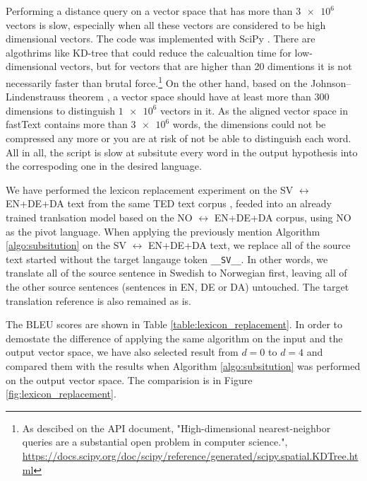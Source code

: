 \documentclass[thesis,fonts=libertine]{cluu}
\begin{document}
Performing a distance query on a vector space that has more than $\num{3e6}$ vectors is slow, especially when all these vectors are considered to be high dimensional vectors. The code was implemented with SciPy \parencite{Virtanen:2019aa}. There are algothrims like KD-tree \parencite{Maneewongvatana:aa} that could reduce the calcualtion time for low-dimensional vectors, but for vectors that are higher than 20 dimentions it is not necessarily faster than brutal force.\footnote{As descibed on the API document, "High-dimensional nearest-neighbor queries are a substantial open problem in computer science.", \url{https://docs.scipy.org/doc/scipy/reference/generated/scipy.spatial.KDTree.html}} On the other hand, based on the Johnson–Lindenstrauss theorem \parencite{johnson1984extensions}, a vector space should have at least more than 300 dimensions to distinguish $\num{1e6}$ vectors in it. As the aligned vector space in fastText contains more than $\num{3e6}$ words, the dimensions could not be compressed any more or you are at risk of not be able to distinguish each word. All in all, the script is slow at subsitute every word in the output hypothesis into the correspoding one in the desired language.

We have performed the lexicon replacement experiment on the SV $\leftrightarrow$ EN+DE+DA text from the same TED text corpus \parencite{Qi:2018aa}, feeded into an already trained tranlsation model based on the NO $\leftrightarrow$ EN+DE+DA corpus, using NO as the pivot language. When applying the previously mention Algorithm \ref{algo:subsitution} on the SV $\leftrightarrow$ EN+DE+DA text, we replace all of the source text started without the target langauge token \verb|__SV__|. In other words, we translate all of the source sentence in Swedish to Norwegian first, leaving all of the other source sentences (sentences in EN, DE or DA) untouched. The target translation reference is also remained as is. 

The BLEU scores are shown in Table \ref{table:lexicon_replacement}. In order to demostate the difference of applying the same algorithm on the input and the output vector space, we have also selected result from $d=0$ to $d=4$ and compared them with the results when Algorithm \ref{algo:subsitution} was performed on the output vector space. The comparision is in Figure \ref{fig:lexicon_replacement}.
\end{document}
